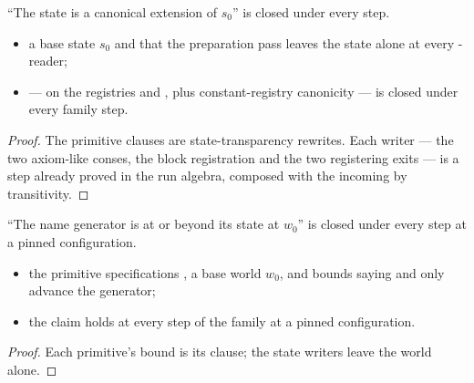 \begin{lemma}
\label{lem:runClosedW_runConcl}
\leanok
{}
 ``The state is a canonical extension of $s_0$'' is closed under every step.
\begin{itemize}
\item {} a base state $s_0$ and that the preparation pass leaves the state alone at every
-reader;
\item {}  ---  on the registries and , plus
constant-registry canonicity --- is closed under every family step.
\end{itemize}
\end{lemma}
\begin{proof}
\leanok
{}
 The primitive clauses are state-transparency rewrites. Each writer --- the two axiom-like
conses, the block registration and the two registering exits --- is a  step already
proved in the run algebra, composed with the incoming  by transitivity.
\end{proof}
\begin{lemma}
\label{lem:runClosedW_gen}
\leanok
{}
 ``The name generator is at or beyond its state at $w_0$'' is closed under every step at
a pinned configuration.
\begin{itemize}
\item {} the primitive specifications , a base world $w_0$, and bounds
saying  and  only advance the generator;
\item {} the claim holds at every step of the family at a pinned configuration.
\end{itemize}
\end{lemma}
\begin{proof}
\leanok
{}
 Each primitive's bound is its  clause; the state writers leave the world
alone.
\end{proof}
